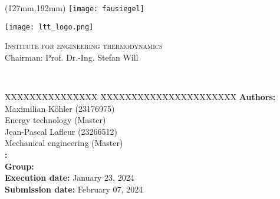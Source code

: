 \begin{titlepage}
	\thispagestyle{empty}

	\begin{textblock*}{\textwidth}(127mm,192mm)
	\texttt{[image: fausiegel]}
	\end{textblock*}

	\begin{minipage}[]{47mm}
		\texttt{[image: ltt\_logo.png]}
	\end{minipage}
	\begin{minipage}[]{.7\textwidth}
		\raggedleft
		\textsc{Institute for engineering thermodynamics}\\ %
		Chairman: Prof. Dr.-Ing. Stefan Will
	\end{minipage}
	
	\vspace{51mm}
	
	{\centering
	
	\large{\arbeit} \\	
	\Large{\textbf{\titel}}
	
	\par}
	
	\vfill
	
	{\raggedright
	\begin{tabbing}
	XXXXXXXXXXXXXXX \= XXXXXXXXXXXXXXXXXXXXXX \kill
		\textbf{Authors:} 			\> Maximilian Köhler (23176975) \\	
									\> Energy technology (Master) \\[12pt]
									\> Jean-Pascal Lafleur (23266512) \\
									\> Mechanical engineering (Master) \\[12pt]
		\textbf{\langdbbetreuer:}	\> \betreuer 						\\[6pt]
		\textbf{Group:}												\\[12pt]
		\textbf{Execution date:}	\> January 23, 2024 			\\[12pt]
		\textbf{Submission date:}	\> February 07, 2024														
	\end{tabbing}
	\par}
\end{titlepage}
